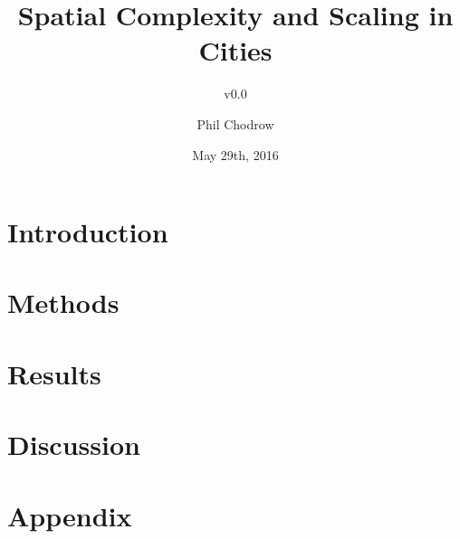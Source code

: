 \documentclass[english]{scrartcl}
\title{Spatial Complexity and Scaling in Cities}
\subtitle{v0.0}
\author{Phil Chodrow}
\date{May 29th, 2016}
\begin{document}
\maketitle
	
\section{Introduction}
	
\section{Methods}
	
\section{Results}
	
\section{Discussion}
	

{}

	
\section{Appendix}
	
\end{document}
